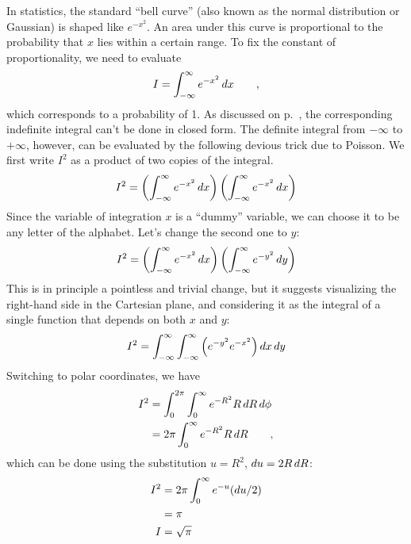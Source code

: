 
\begin{eg}\label{eg:poisson-trick}
In statistics, the standard ``bell curve'' (also known as the normal distribution or Gaussian)
is shaped like $e^{-x^2}$. An area under this curve is proportional to the probability that $x$
lies within a certain range. To fix the constant of proportionality, we need to evaluate
\begin{equation*}
  I = \int_{-\infty}^\infty e^{-x^2} \mathop{d\!} x \qquad ,
\end{equation*}
which corresponds to a probability of 1.
As discussed on p.~\pageref{impossible-integrals}, the corresponding indefinite integral can't be
done in closed form. The definite integral from $-\infty$ to $+\infty$, however, can be evaluated
by the following devious trick due to Poisson. We first write $I^2$ as a product of two copies
of the integral.
\begin{equation*}
  I^2 = \left(\int_{-\infty}^\infty e^{-x^2} \mathop{d\!} x\right) \left(\int_{-\infty}^\infty e^{-x^2} \mathop{d\!} x\right)
\end{equation*}
Since the variable of integration $x$ is a ``dummy'' variable, we can choose it to be any letter of the
alphabet. Let's change the second one to $y$:
\begin{equation*}
  I^2 = \left(\int_{-\infty}^\infty e^{-x^2} \mathop{d\!} x\right) \left(\int_{-\infty}^\infty e^{-y^2} \mathop{d\!} y\right)
\end{equation*}
This is in principle a pointless and trivial change, but it suggests visualizing the right-hand side in
the Cartesian plane, and considering it as the integral of a single function that depends on both $x$ and $y$:
\begin{align*}
  I^2 = \int_{-\infty}^\infty  \int_{-\infty}^\infty \left( e^{-y^2}e^{-x^2}\right) \mathop{d\!} x \mathop{d\!} y
\end{align*}
Switching to polar coordinates, we have
\begin{align*}
  I^2 &=  \int_0^{2\pi} \int_0^\infty e^{-R^2} R \mathop{d\!} R \mathop{d\!} \phi \\
      &=  2\pi \int_0^\infty e^{-R^2} R \mathop{d\!} R \qquad ,
\end{align*}
which can be done using the substitution $u=R^2$, $\mathop{d\!} u=2R \mathop{d\!} R$:
\begin{align*}
  I^2 &=  2\pi \int_0^\infty e^{-u} (\mathop{d\!} u/2) \\
      &= \pi \\
  I &= \sqrt{\pi}
\end{align*}
\end{eg}

